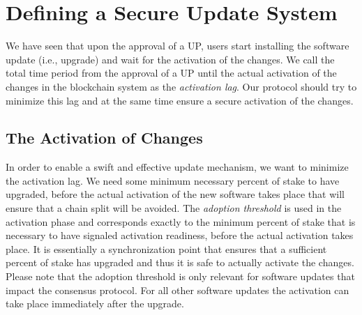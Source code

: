 \section{Defining a Secure Update System} \label{secureupdate}
We have seen that upon the approval of a UP, users start installing the software update (i.e., upgrade) and wait for the activation of the changes. We call the total  time period from the approval of a UP until the actual activation of the changes in the blockchain system as the \emph{activation lag}. Our protocol should try to minimize this lag and at the same time ensure a secure activation of the changes.


\subsection{The Activation of Changes}\label{se:informal}
In order to enable a swift and effective update mechanism, we want to minimize the activation lag. 
We need some minimum necessary percent of stake to have upgraded, before the actual activation of the new software takes place that will ensure that a chain split will be avoided. The \emph{adoption threshold} is used in the activation phase and corresponds exactly to the minimum percent of stake that is necessary to have signaled activation readiness, before the actual activation takes place. It is essentially a synchronization point that ensures that a sufficient percent of stake has upgraded and thus it is safe to actually activate the changes. 
 Please note that the adoption threshold is only relevant for software updates that impact the consensus protocol. For all other software updates the activation can take place immediately after the upgrade.

